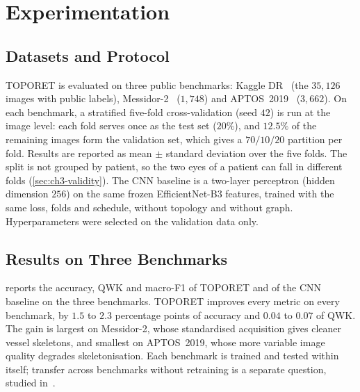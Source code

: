 \section{Experimentation}
\label{sec:ch3-exp}

\subsection{Datasets and Protocol}

TOPORET is evaluated on three public benchmarks: Kaggle DR~\cite{kaggle2015eyepacs} (the
$35{,}126$ images with public labels), Messidor-2~\cite{decenciere2014messidor} ($1{,}748$)
and APTOS~2019~\cite{aptos2019} ($3{,}662$). On each benchmark, a stratified five-fold
cross-validation (seed $42$) is run at the image level: each fold serves once as the test
set ($20\%$), and $12.5\%$ of the remaining images form the validation set, which gives a
$70/10/20$ partition per fold. Results are reported as mean $\pm$ standard deviation over
the five folds. The split is not grouped by patient, so the two eyes of a patient can fall
in different folds (\cref{sec:ch3-validity}). The CNN baseline is a two-layer perceptron
(hidden dimension $256$) on the same frozen EfficientNet-B3 features, trained with the same
loss, folds and schedule, without topology and without graph. Hyperparameters were
selected on the validation data only.

\subsection{Results on Three Benchmarks}
\label{sec:crossdata}

 reports the accuracy, QWK and macro-F1 of TOPORET and of the CNN
baseline on the three benchmarks. TOPORET improves every metric on every benchmark, by
$1.5$ to $2.3$ percentage points of accuracy and $0.04$ to $0.07$ of QWK. The gain is
largest on Messidor-2, whose standardised acquisition gives cleaner vessel skeletons, and
smallest on APTOS~2019, whose more variable image quality degrades skeletonisation. Each
benchmark is trained and tested within itself; transfer across benchmarks without
retraining is a separate question, studied in~\cite{belhadj2026miua}.

